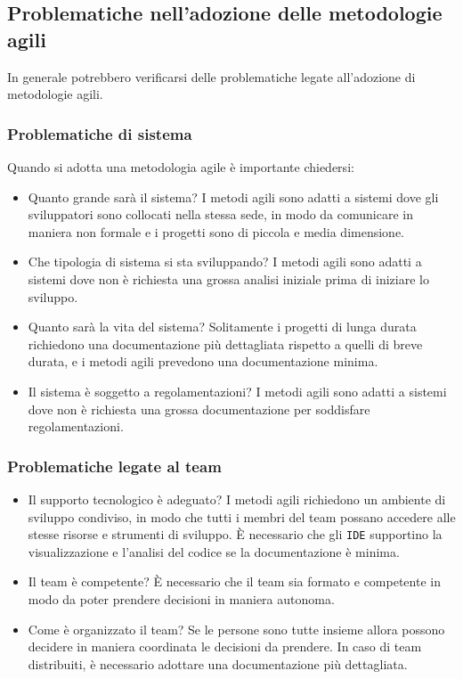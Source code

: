 \subsection{Problematiche nell'adozione delle metodologie agili}
In generale potrebbero verificarsi delle problematiche legate all'adozione di metodologie
agili.
\subsubsection{Problematiche di sistema}
Quando si adotta una metodologia agile è importante chiedersi:
\begin{itemize}
    \item Quanto grande sarà il sistema? I metodi agili sono adatti a
    sistemi dove gli sviluppatori sono collocati nella stessa sede,
    in modo da comunicare in maniera non formale e i progetti
    sono di piccola e media dimensione.
    \item Che tipologia di sistema si sta sviluppando? I metodi agili
    sono adatti a sistemi dove non è richiesta una grossa analisi 
    iniziale prima di iniziare lo sviluppo.
    \item Quanto sarà la vita del sistema? Solitamente i progetti 
    di lunga durata richiedono una documentazione più dettagliata
    rispetto a quelli di breve durata, e i metodi agili prevedono
    una documentazione minima.
    \item Il sistema è soggetto a regolamentazioni? I metodi agili
    sono adatti a sistemi dove non è richiesta una grossa documentazione
    per soddisfare regolamentazioni.
\end{itemize}
\subsubsection{Problematiche legate al team}
\begin{itemize}
    \item Il supporto tecnologico è adeguato? I metodi agili richiedono
    un ambiente di sviluppo condiviso, in modo che tutti i membri del team
    possano accedere alle stesse risorse e strumenti di sviluppo. È necessario 
    che gli \texttt{IDE} supportino la visualizzazione e l'analisi del codice
    se la documentazione è minima. 
    \item Il team è competente? È necessario
    che il team sia formato e competente in modo da poter prendere decisioni
    in maniera autonoma.
    \item Come è organizzato il team? Se le persone sono tutte insieme 
    allora possono decidere in maniera coordinata le decisioni da prendere.
    In caso di team distribuiti, è necessario adottare una documentazione 
    più dettagliata.
\end{itemize}
